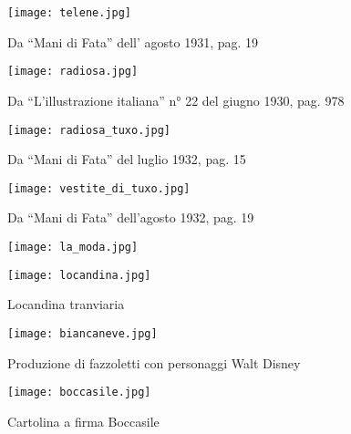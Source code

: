 \begin{figure}[h]
	\centering
		\texttt{[image: telene.jpg]}
	\caption{Da “Mani di Fata” dell’ agosto 1931, pag. 19}
	\label{fig:telene}
\end{figure}

\newpage

\begin{figure}[h]
	\centering
		\texttt{[image: radiosa.jpg]}
	\caption{Da “L’illustrazione italiana” n° 22 del  giugno 1930, pag. 978}
	\label{fig:radiosa}
\end{figure}

\newpage

\begin{figure}[h]
	\centering
		\texttt{[image: radiosa\_tuxo.jpg]}
	\caption{Da “Mani di Fata” del luglio 1932, pag. 15}
	\label{fig:radiosa_tuxo}
\end{figure}

\newpage

\begin{figure}[h]
	\centering
		\texttt{[image: vestite\_di\_tuxo.jpg]}
	\caption{Da “Mani di Fata” dell’agosto 1932, pag. 19}
	\label{fig:vestite_di_tuxo}
\end{figure}

\newpage

\begin{figure}[h]
	\centering
		\texttt{[image: la\_moda.jpg]}
	\caption{}
	\label{fig:la_moda}
\end{figure}

\newpage

\begin{figure}[h]
	\centering
		\texttt{[image: locandina.jpg]}
	\caption{Locandina tranviaria}
	\label{fig:locandina}
\end{figure}

\newpage

\begin{figure}[h]
	\centering
		\texttt{[image: biancaneve.jpg]}
	\caption{Produzione di fazzoletti con personaggi Walt Disney}
	\label{fig:biancaneve}
\end{figure}
\begin{figure}[h]
	\centering
		\texttt{[image: boccasile.jpg]}
	\caption{Cartolina a firma Boccasile}
	\label{fig:boccasile}
\end{figure}

\newpage


